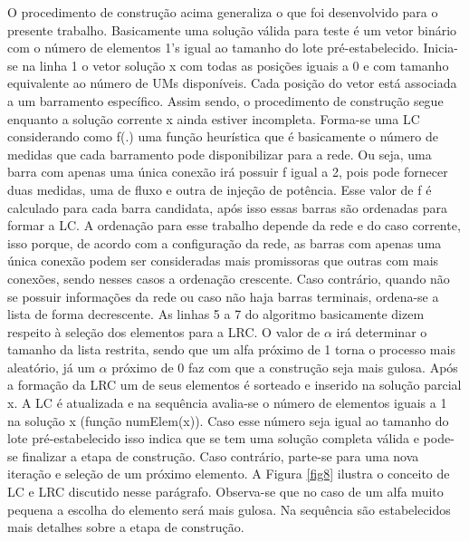 \documentclass[12pt]{article}
\begin{document}
O procedimento de construção acima generaliza o que foi desenvolvido para o presente trabalho. Basicamente uma solução válida para teste é um vetor binário com o número de elementos 1's igual ao tamanho do lote pré-estabelecido. Inicia-se na linha 1 o vetor solução x com todas as posições iguais a 0 e com tamanho equivalente ao número de UMs disponíveis. Cada posição do vetor está associada a um barramento específico. Assim sendo, o procedimento de construção segue enquanto a solução corrente x ainda estiver incompleta. Forma-se uma LC considerando como f(.) uma função heurística que é basicamente o número de medidas que cada barramento pode disponibilizar para a rede. Ou seja, uma barra com apenas uma única conexão irá possuir f igual a 2, pois pode fornecer duas medidas, uma de fluxo e outra de injeção de potência. Esse valor de f é calculado para cada barra candidata, após isso essas barras são ordenadas para formar a LC. A ordenação para esse trabalho depende da rede e do caso corrente, isso porque, de acordo com a configuração da rede, as barras com apenas uma única conexão podem ser consideradas mais promissoras que outras com mais conexões, sendo nesses casos a ordenação crescente. Caso contrário, quando não se possuir informações da rede ou caso não haja barras terminais, ordena-se a lista de forma decrescente. As linhas 5 a 7 do algoritmo basicamente dizem respeito à seleção dos elementos para a LRC. O valor de $\alpha$ irá determinar o tamanho da lista restrita, sendo que um alfa próximo de 1 torna o processo mais aleatório, já um $\alpha$ próximo de 0 faz com que a construção seja mais gulosa. Após a formação da LRC um de seus elementos é sorteado e inserido na solução parcial x. A LC é atualizada e na sequência avalia-se o número de elementos iguais a 1 na solução x (função numElem(x)). Caso esse número seja igual ao tamanho do lote pré-estabelecido isso indica que se tem uma solução completa válida e pode-se finalizar a etapa de construção. Caso contrário, parte-se para uma nova iteração e seleção de um próximo elemento. A Figura \ref{fig8} ilustra o conceito de LC e LRC discutido nesse parágrafo. Observa-se que no caso de um alfa muito pequena a escolha do elemento será mais gulosa. Na sequência são estabelecidos mais detalhes sobre a etapa de construção.
\end{document}
